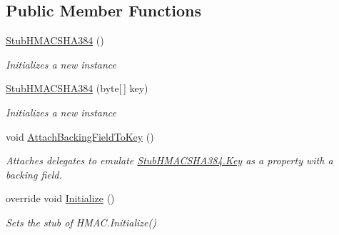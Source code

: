 \subsection*{Public Member Functions}
\begin{DoxyCompactItemize}
\item 
\hyperlink{class_system_1_1_security_1_1_cryptography_1_1_fakes_1_1_stub_h_m_a_c_s_h_a384_a59dd2751965f65ed23ee797d8305549e}{Stub\-H\-M\-A\-C\-S\-H\-A384} ()
\begin{DoxyCompactList}\small\item\em Initializes a new instance\end{DoxyCompactList}\item 
\hyperlink{class_system_1_1_security_1_1_cryptography_1_1_fakes_1_1_stub_h_m_a_c_s_h_a384_aedb36aae6ed32e6186cfba66fb66aece}{Stub\-H\-M\-A\-C\-S\-H\-A384} (byte\mbox{[}$\,$\mbox{]} key)
\begin{DoxyCompactList}\small\item\em Initializes a new instance\end{DoxyCompactList}\item 
void \hyperlink{class_system_1_1_security_1_1_cryptography_1_1_fakes_1_1_stub_h_m_a_c_s_h_a384_ac0a0d1114d5a9e73efb488a04ed7af89}{Attach\-Backing\-Field\-To\-Key} ()
\begin{DoxyCompactList}\small\item\em Attaches delegates to emulate \hyperlink{class_system_1_1_security_1_1_cryptography_1_1_fakes_1_1_stub_h_m_a_c_s_h_a384_a5dbb672a7692fd08a49e84d2b3101929}{Stub\-H\-M\-A\-C\-S\-H\-A384.\-Key} as a property with a backing field.\end{DoxyCompactList}\item 
override void \hyperlink{class_system_1_1_security_1_1_cryptography_1_1_fakes_1_1_stub_h_m_a_c_s_h_a384_a8f5ca9b3d126da4e3c92794af1ef194b}{Initialize} ()
\begin{DoxyCompactList}\small\item\em Sets the stub of H\-M\-A\-C.\-Initialize()\end{DoxyCompactList}\end{DoxyCompactItemize}
